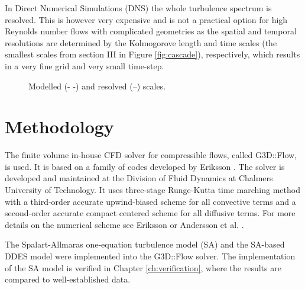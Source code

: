 In Direct Numerical Simulations (DNS) the whole turbulence spectrum is resolved. This is however very expensive and is not a practical option for high Reynolds number flows with complicated geometries as the spatial and temporal resolutions are determined by the Kolmogorove length and time scales (the smallest scales from section III in Figure \ref{fig:cascade}), respectively, which results in a very fine grid and very small time-step. 
\begin{figure}[h]
  \centering
{}
  \caption{Modelled (- -) and resolved (--) scales.}\label{fig:Scales}
\end{figure}





%
%
%
\chapter{Methodology\label{ch:NM}}
The finite volume in-house CFD solver for compressible flows, called G3D::Flow, is used. It is based on a family of codes developed by Eriksson \cite{g3dflow}. The solver is developed and maintained at the Division of Fluid Dynamics at Chalmers University of Technology. It uses three-stage Runge-Kutta time marching method with a third-order accurate upwind-biased scheme for all convective terms and a second-order accurate compact centered scheme for all diffusive terms. For more details on the numerical scheme see Eriksson \cite{g3dflow} or Andersson et al. \cite{g3dflowNA}.

The Spalart-Allmaras one-equation turbulence model (SA) and the SA-based DDES model were implemented into the G3D::Flow solver. The implementation of the SA model is verified in Chapter \ref{ch:verification}, where the results are compared to well-established data. 
